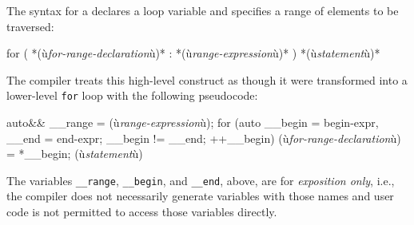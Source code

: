 The syntax for a  declares a loop
variable and specifies a range of elements to be traversed:


\begin{emcppslisting}[emcppsignore={grammar, not code, but leave as c++}]
for ( *(ù{\it{for-range-declaration}}ù)* : *(ù{\it{range-expression}}ù)* ) *(ù{\it{statement}}ù)*
\end{emcppslisting}


\noindent The compiler treats this high-level construct as though it were
transformed into a lower-level \lstinline!for! loop with the following
pseudocode:


\begin{emcppslisting}[emcppsignore={grammar, not code, but leave as c++}]
{
    auto&& __range = (ù{\it{range-expression}}ù);
    for (auto __begin = begin-expr, __end = end-expr;
        __begin != __end;
        ++__begin)
    {
        (ù{\it{for-range-declaration}}ù) = *__begin;
        (ù{\it{statement}}ù)
    }
}
\end{emcppslisting}


\noindent The variables \lstinline!__range!, \lstinline!__begin!, and
\lstinline!__end!, above, are for \emph{exposition only}, i.e., the
compiler does not necessarily generate variables with those names and
user code is not permitted to access those variables directly.

